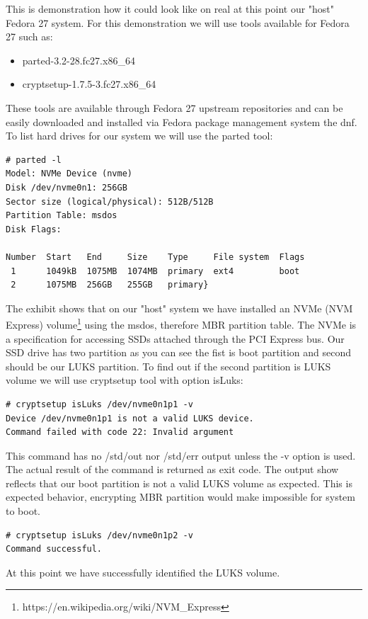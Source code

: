 This is demonstration how it could look like on real at this point our "host" Fedora 27 system.
For this demonstration we will use tools available for Fedora 27 such as:\\
\begin{itemize}
    \item parted-3.2-28.fc27.x86\_64
    \item cryptsetup-1.7.5-3.fc27.x86\_64
\end{itemize}
These tools are available through Fedora 27 upstream repositories and can be easily downloaded and installed via Fedora package management system the dnf.
To list hard drives for our system we will use the parted tool:
\begin{lstlisting}[columns=fixed,tabsize=4,backgroundcolor=\color{yellow!10}]
# parted -l
Model: NVMe Device (nvme)
Disk /dev/nvme0n1: 256GB
Sector size (logical/physical): 512B/512B
Partition Table: msdos
Disk Flags:

Number  Start   End     Size    Type     File system  Flags
 1      1049kB  1075MB  1074MB  primary  ext4         boot
 2      1075MB  256GB   255GB   primary}
\end{lstlisting}
The exhibit shows that on our "host" system we have installed an NVMe (NVM Express) volume\footnote{https://en.wikipedia.org/wiki/NVM\_Express} using the msdos, therefore MBR partition table.
The NVMe is a specification for accessing SSDs attached through the PCI Express bus.
Our SSD drive has two partition as you can see the fist is boot partition and second should be our LUKS partition.
To find out if the second partition is LUKS volume we will use cryptsetup tool with option isLuks:
\begin{lstlisting}[columns=fixed,tabsize=4,backgroundcolor=\color{yellow!10}]
# cryptsetup isLuks /dev/nvme0n1p1 -v
Device /dev/nvme0n1p1 is not a valid LUKS device.
Command failed with code 22: Invalid argument
\end{lstlisting}
This command has no /std/out nor /std/err output unless the -v option is used.
The actual result of the command is returned as exit code.
The output show reflects that our boot partition is not a valid LUKS volume as expected.
This is expected behavior, encrypting MBR partition would make impossible for system to boot.
\begin{lstlisting}[columns=fixed,tabsize=4,backgroundcolor=\color{yellow!10}]
# cryptsetup isLuks /dev/nvme0n1p2 -v
Command successful.
\end{lstlisting}
At this point we have successfully identified the LUKS volume.
